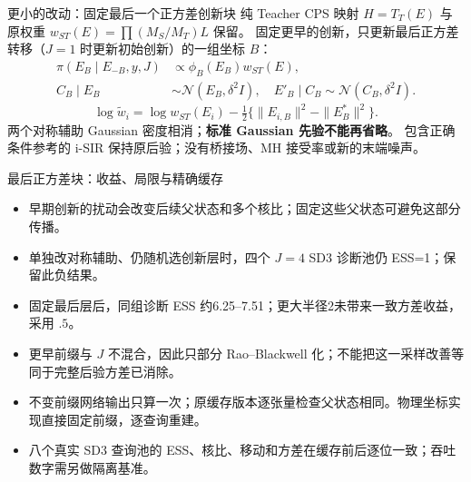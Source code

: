 \documentclass[10pt,aspectratio=169]{beamer}
\newcommand{\N}{\mathcal N}
\begin{document}
\begin{frame}{更小的改动：固定最后一个正方差创新块}
\small
纯 Teacher CPS 映射 $H=T_T(E)$ 与原权重 $w_{ST}(E)=\prod(M_S/M_T)L$ 保留。
固定更早的创新，只更新最后正方差转移（$J=1$ 时更新初始创新）的一组坐标 $B$：
\begin{align}
\pi(E_B\mid E_{-B},y,J)&\propto\phi_B(E_B)w_{ST}(E),\\
C_B\mid E_B&\sim\N(E_B,\delta^2 I),\quad E'_B\mid C_B\sim\N(C_B,\delta^2 I).
\end{align}
\begin{equation}
\log\widetilde w_i=\log w_{ST}(E_i)
-\tfrac12\{\|E_{i,B}\|^2-\|E^*_{B}\|^2\}.
\end{equation}
两个对称辅助 Gaussian 密度相消；\textbf{标准 Gaussian 先验不能再省略}。
包含正确条件参考的 i-SIR 保持原后验；没有桥接场、MH 接受率或新的末端噪声。
\end{frame}

\begin{frame}{最后正方差块：收益、局限与精确缓存}
\small
\begin{itemize}\itemsep5pt
\item 早期创新的扰动会改变后续父状态和多个核比；固定这些父状态可避免这部分传播。
\item 单独改对称辅助、仍随机选创新层时，四个 $J=4$ SD3 诊断池仍 ESS=1；保留此负结果。
\item 固定最后层后，同组诊断 ESS 约6.25--7.51；更大半径2未带来一致方差收益，采用 $.5$。
\item 更早前缀与 $J$ 不混合，因此只部分 Rao--Blackwell 化；不能把这一采样改善等同于完整后验方差已消除。
\item 不变前缀网络输出只算一次；原缓存版本逐张量检查父状态相同。物理坐标实现直接固定前缀，逐查询重建。
\item 八个真实 SD3 查询池的 ESS、核比、移动和方差在缓存前后逐位一致；吞吐数字需另做隔离基准。
\end{itemize}
\end{frame}
\end{document}
